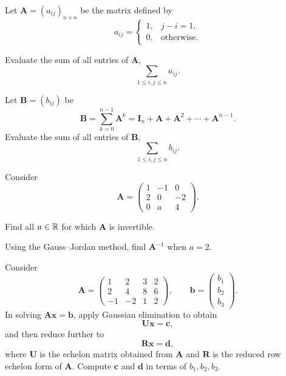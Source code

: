 \documentclass[11pt,oneside]{article}
\begin{document}
\begin{problem}
Let $\mathbf A=(a_{ij})_{n\times n}$ be the matrix defined by
\[
a_{ij}=
\begin{cases}
1, & j-i=1,\\
0, & \text{otherwise}.
\end{cases}
\]
\begin{problemsubparts}
\item Evaluate the sum of all entries of $\mathbf A$,
\[
\sum_{1\le i,j\le n} a_{ij}.
\]
\item Let $\mathbf B=(b_{ij})$ be
\[
\mathbf B=\sum_{k=0}^{n-1}\mathbf A^k
=\mathbf I_n+\mathbf A+\mathbf A^2+\cdots+\mathbf A^{n-1}.
\]
Evaluate the sum of all entries of $\mathbf B$,
\[
\sum_{1\le i,j\le n} b_{ij}.
\]
\end{problemsubparts}
\end{problem}

\begin{problem}
Consider
\[
\mathbf A=
\begin{pmatrix}
1&-1&0\\
2&0&-2\\
0&a&4
\end{pmatrix}.
\]
\begin{problemsubparts}
\item Find all $a\in\mathbb{R}$ for which $\mathbf A$ is invertible.
\item Using the Gauss--Jordan method, find $\mathbf A^{-1}$ when $a=2$.
\end{problemsubparts}
\end{problem}

\begin{problem}
Consider
\[
\mathbf A=
\begin{pmatrix}
1&2&3&2\\
2&4&8&6\\
-1&-2&1&2
\end{pmatrix},
\qquad
\mathbf b=
\begin{pmatrix}
b_1\\b_2\\b_3
\end{pmatrix}.
\]
In solving $\mathbf A\mathbf x=\mathbf b$, apply Gaussian elimination to obtain
\[
\mathbf U\mathbf x=\mathbf c,
\]
and then reduce further to
\[
\mathbf R\mathbf x=\mathbf d,
\]
where $\mathbf U$ is the echelon matrix obtained from $\mathbf A$ and $\mathbf R$ is the reduced row echelon form of $\mathbf A$. Compute $\mathbf c$ and $\mathbf d$ in terms of $b_1,b_2,b_3$.
\end{problem}
\end{document}
